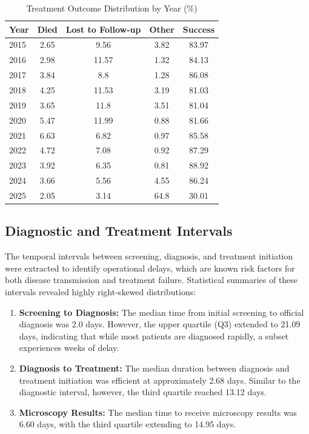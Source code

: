 \documentclass[12pt]{article}
\begin{document}
\begin{table}[htbp]

\caption{Treatment Outcome Distribution by Year (\%)}
\label{tab:outcome_trends_by_year}
\begin{tabular}{lcccc}

\toprule

Year & Died & Lost to Follow-up & Other & Success \\

\midrule

2015 & 2.65 & 9.56 & 3.82 & 83.97 \\
2016 & 2.98 & 11.57 & 1.32 & 84.13 \\
2017 & 3.84 & 8.8 & 1.28 & 86.08 \\
2018 & 4.25 & 11.53 & 3.19 & 81.03 \\
2019 & 3.65 & 11.8 & 3.51 & 81.04 \\
2020 & 5.47 & 11.99 & 0.88 & 81.66 \\
2021 & 6.63 & 6.82 & 0.97 & 85.58 \\
2022 & 4.72 & 7.08 & 0.92 & 87.29 \\
2023 & 3.92 & 6.35 & 0.81 & 88.92 \\
2024 & 3.66 & 5.56 & 4.55 & 86.24 \\
2025 & 2.05 & 3.14 & 64.8 & 30.01 \\

\bottomrule

\end{tabular}

\end{table}


\subsection{Diagnostic and Treatment Intervals}

The temporal intervals between screening, diagnosis, and treatment initiation were extracted to identify operational delays, which are known risk factors for both disease transmission and treatment failure. Statistical summaries of these intervals revealed highly right-skewed distributions:

\begin{enumerate}
    \item \textbf{Screening to Diagnosis:} The median time from initial screening to official diagnosis was 2.0 days. However, the upper quartile (Q3) extended to 21.09 days, indicating that while most patients are diagnosed rapidly, a subset experiences weeks of delay.
    \item \textbf{Diagnosis to Treatment:} The median duration between diagnosis and treatment initiation was efficient at approximately 2.68 days. Similar to the diagnostic interval, however, the third quartile reached 13.12 days.
    \item \textbf{Microscopy Results:} The median time to receive microscopy results was 6.60 days, with the third quartile extending to 14.95 days.
\end{enumerate}
\end{document}

